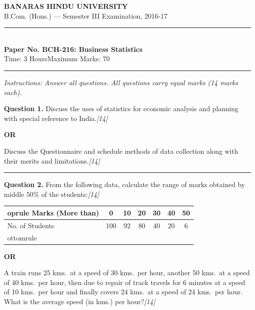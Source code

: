 \documentclass[11pt,a4paper]{article}
\newcommand{\pts}[1]{\hfill   \textit{[#1]}}
\begin{document}
\begin{center}
  {\large\bfseries BANARAS HINDU UNIVERSITY}\\[2pt]
  {\normalsize B.Com. (Hons.) --- Semester III Examination, 2016-17}\\[6pt]
  \rule{0.8\linewidth}{0.5pt}\\[6pt]
  {\large\bfseries Paper No. BCH-216: Business Statistics}\\[4pt]
  {\normalsize Time: 3 Hours\hfill Maximum Marks: 70}
\end{center}

\rule{\linewidth}{0.4pt}

\smallskip



\noindent   \textit{Instructions: Answer all questions. All questions carry equal marks (14 marks each).}

\bigskip




\noindent   \textbf{Question 1.}
Discuss the uses of statistics for economic analysis and planning with special reference to India.\pts{14}

\centerline{   \textbf{OR}}

Discuss the Questionnaire and schedule methods of data collection along with their merits and limitations.\pts{14}

\medskip\rule{\linewidth}{0.2pt}




\noindent   \textbf{Question 2.}
From the following data, calculate the range of marks obtained by middle 50\% of the students:\pts{14}

\begin{center}
  
\begin{tabular}{lcccccc}
     oprule
    Marks (More than) & 0 & 10 & 20 & 30 & 40 & 50 \\
    \midrule
    No. of Students & 100 & 92 & 80 & 40 & 20 & 6 \\
    ottomrule
  \end{tabular}
\end{center}

\centerline{   \textbf{OR}}

A train runs 25 kms.\ at a speed of 30 kms.\ per hour, another 50 kms.\ at a speed of 40 kms.\ per hour, then due to repair of track travels for 6 minutes at a speed of 10 kms.\ per hour and finally covers 24 kms.\ at a speed of 24 kms.\ per hour. What is the average speed (in kms.) per hour?\pts{14}
\end{document}

